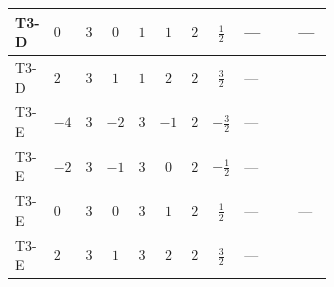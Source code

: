 \documentclass[8pt]{article}
\begin{document}
\begin{landscape}
\begin{longtable}{@{}llcccccc >{\raggedright\arraybackslash}p{0.21\linewidth} >{\raggedright\arraybackslash}p{0.21\linewidth} >{\raggedright\arraybackslash}p{0.21\linewidth}@{}}
\midrule
T3-D & $0$ & $3$ & $0$ & $1$ & $1$ & $2$ & $\frac{1}{2}$ & --- & \scriptsize\adjustbox{max width=\linewidth}{$\begin{gathered} -4 \operatorname{Tr}\!\left({M_F}\,\left({M_F}\right)^{\dagger}\,\left({y_1}\right)^{T}\,\left({y_1}\right)^{*}\right)\end{gathered}$} & --- \\
\midrule
T3-D & $2$ & $3$ & $1$ & $1$ & $2$ & $2$ & $\frac{3}{2}$ & --- & \scriptsize\adjustbox{max width=\linewidth}{$\begin{gathered} -4 \operatorname{Tr}\!\left({M_F}\,\left({M_F}\right)^{\dagger}\,\left({y_1}\right)^{T}\,\left({y_1}\right)^{*}\right)\end{gathered}$} & \scriptsize\adjustbox{max width=\linewidth}{$\begin{gathered} -6 {g_1}^2 {m_1^2}\end{gathered}$} \\
\midrule
T3-E & $-4$ & $3$ & $-2$ & $3$ & $-1$ & $2$ & $-\frac{3}{2}$ & --- & \scriptsize\adjustbox{max width=\linewidth}{$\begin{gathered} -4 \operatorname{Tr}\!\left({M_F}\,\left({M_F}\right)^{\dagger}\,\left({y_1}\right)^{T}\,\left({y_1}\right)^{*}\right)\end{gathered}$} & \scriptsize\adjustbox{max width=\linewidth}{$\begin{gathered} -24 {g_1}^2 {m_1^2}\end{gathered}$} \\
\midrule
T3-E & $-2$ & $3$ & $-1$ & $3$ & $0$ & $2$ & $-\frac{1}{2}$ & --- & \scriptsize\adjustbox{max width=\linewidth}{$\begin{gathered} -4 \operatorname{Tr}\!\left({M_F}\,\left({M_F}\right)^{\dagger}\,\left({y_1}\right)^{T}\,\left({y_1}\right)^{*}\right)\end{gathered}$} & \scriptsize\adjustbox{max width=\linewidth}{$\begin{gathered} -6 {g_1}^2 {m_1^2}\end{gathered}$} \\
\midrule
T3-E & $0$ & $3$ & $0$ & $3$ & $1$ & $2$ & $\frac{1}{2}$ & --- & \scriptsize\adjustbox{max width=\linewidth}{$\begin{gathered} -4 \operatorname{Tr}\!\left({M_F}\,\left({M_F}\right)^{\dagger}\,\left({y_1}\right)^{T}\,\left({y_1}\right)^{*}\right)\end{gathered}$} & --- \\
\midrule
T3-E & $2$ & $3$ & $1$ & $3$ & $2$ & $2$ & $\frac{3}{2}$ & --- & \scriptsize\adjustbox{max width=\linewidth}{$\begin{gathered} -4 \operatorname{Tr}\!\left({M_F}\,\left({M_F}\right)^{\dagger}\,\left({y_1}\right)^{T}\,\left({y_1}\right)^{*}\right)\end{gathered}$} & \scriptsize\adjustbox{max width=\linewidth}{$\begin{gathered} -6 {g_1}^2 {m_1^2}\end{gathered}$} \\

\end{longtable}
\end{landscape}
\end{document}
